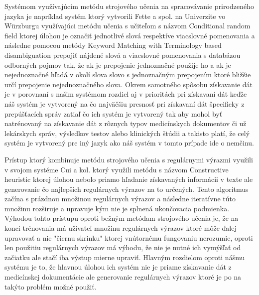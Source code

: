 Systémom využívajúcim metódu strojového učenia na
spracovávanie prirodzeného jazyka je napríklad 
systém ktorý vytvorili Fette a spol. na Univerzite
vo Würzburgu \cite{infExtGer} využívajúci metódu učenia s učiteľom 
s názvom Conditional random field \cite{CRF} ktorej úlohou
je označiť jednotlivé slová respektíve viacslovné
pomenovania a následne pomocou metódy 
Keyword Matching with Terminology based disambiguation
prepojiť nájdené slová a viacslovné pomenovania s databázou
odborných pojmov tak, že ak je prepojenie jednoznačné
použije ho a ak je nejednoznačné hľadá v okolí slova
slovo s jednoznačným prepojením ktoré bližšie určí
prepojenie nejednoznačného slova. Okrem samotného spôsobu
získavanie dát je v porovnaní s našim systémom rozdiel 
aj v prioritách pri získavaní dát keďže náš systém 
je vytvorený na čo najväčšiu presnosť pri získavaní
dát špecificky z prepúšťacích správ zatiaľ čo ich 
systém je vytvorený tak aby mohol byť natrénovaný na získavanie
dát z rôznych typov medicínskych dokumentov či už
lekárskych správ, výsledkov testov alebo klinických 
štúdii a takisto platí, že celý systém je vytvorený 
pre iný jazyk ako náš systém v tomto prípade ide o 
nemčinu. 

Prístup ktorý kombinuje metódu strojového učenia 
s regulárnymi výrazmi využili v svojom systéme
Cui a kol. \cite{CHA} ktorý využili metódu s názvom 
Constructive heuristic ktorej úlohou nebolo
priamo hľadanie získavaných informácii v texte ale
generovanie čo najlepších regulárnych výrazov
na to určených. Tento algoritmus začína s
prázdnou množinou regulárnych výrazov a 
následne iteratívne túto množinu rozširuje
a upravuje kým nie je splnená ukončovacia
podmienka. Výhodou tohto prístupu oproti
bežným metódam strojového učenia je, 
že na konci trénovania má užívateľ množinu
regulárnych výrazov ktoré môže ďalej upravovať
a nie "čiernu skrinku" ktorej vnútornému fungovaniu
nerozumie, oproti len použitiu regulárnych výrazov
má výhodu, že nie je nutné ich vymýšľať
od začiatku ale stačí iba výstup mierne upraviť.
Hlavným rozdielom oproti nášmu systému je to, 
že hlavnou úlohou ich systém nie je priame získavanie
dát z medicínskej dokumentácie ale generovanie 
regulárnych výrazov ktoré je po na takýto problém
možné použiť.

